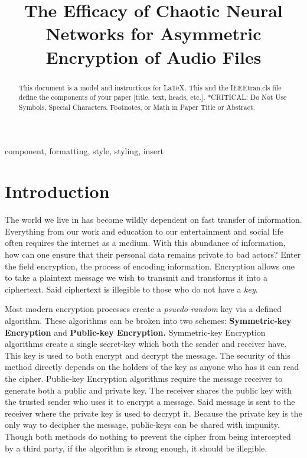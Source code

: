 \documentclass[conference]{IEEEtran}
\begin{document}
\title{The Efficacy of Chaotic Neural Networks for Asymmetric Encryption of Audio Files}

\author{
}

\maketitle

\begin{abstract}
This document is a model and instructions for \LaTeX.
This and the IEEEtran.cls file define the components of your paper [title, text, heads, etc.]. *CRITICAL: Do Not Use Symbols, Special Characters, Footnotes,
or Math in Paper Title or Abstract.
\end{abstract}

\begin{IEEEkeywords}
component, formatting, style, styling, insert
\end{IEEEkeywords}

\section{Introduction}\label{sec:introduction}

The world we live in has become wildly dependent on fast transfer of information.
Everything from our work and education to our entertainment and social life often requires the internet as a medium.
With this abundance of information, how can one ensure that their personal data remains private to bad actors?
Enter the field encryption, the process of encoding information.
Encryption allows one to take a plaintext message we wish to transmit and transforms it into a ciphertext.
Said ciphertext is illegible to those who do not have a \textit{key}.


Most modern encryption processes create a \textit{psuedo-random} key via a defined algorithm.
These algorithms can be broken into two schemes: \textbf{Symmetric-key Encryption} and \textbf{Public-key Encryption.}
Symmetric-key Encryption algorithms create a single secret-key which both the sender and receiver have.
This key is used to both encrypt and decrypt the message.
The security of this method directly depends on the holders of the key as anyone who has it can read the cipher.
Public-key Encryption algorithms require the message receiver to generate both a public and private key.
The receiver shares the public key with the trusted sender who uses it to encrypt a message.
Said message is sent to the receiver where the private key is used to decrypt it.
Because the private key is the only way to decipher the message, public-keys can be shared with impunity.
Though both methods do nothing to prevent the cipher from being intercepted by a third party, if the algorithm is strong enough, it should be illegible.
\end{document}

